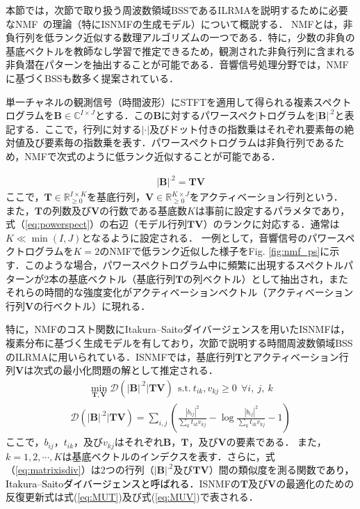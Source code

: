 {本節では，次節で取り扱う周波数領域BSSであるILRMAを説明するために必要なNMF~\cite{NMF}の理論（特にISNMFの生成モデル\cite{isnmf}）について概説する．}
NMFとは，{非負行列を低ランク近似する数理アルゴリズムの一つである．特に，少数の非負の基底ベクトルを教師なし学習で推定できるため，観測された非負行列に含まれる非負潜在パターンを抽出することが可能である．音響信号処理分野では，NMFに基づくBSSも数多く提案されている\cite{singlechsep, supNMF, MNMF_oz, iwase}．}

単一チャネルの{観測信号（時間波形）にSTFTを適用して得られる複素スペクトログラムを$\bm{B}\in\mathbb{C}^{I\times J}$とする．この$\bm{B}$に対するパワースペクトログラムを$|\bm{B}|^{.2}$と表記する．ここで，行列に対する$|\cdot|$及びドット付きの指数乗はそれぞれ要素毎の絶対値及び要素毎の指数乗を表す．パワースペクトログラムは非負行列であるため，NMFで次式のように低ランク近似することが可能である．}

\begin{align}
    |\bm{B}|^{.2} = \bm{TV}　\label{eq:powerspect}
\end{align}
ここで，$\bm{T} \in \mathbb{R}^{I \times K}_{\geq 0}$を基底行列，$\bm{V} \in \mathbb{R}^{K \times J}_{\geq 0}$をアクティベーション行列という．
{また，$\bm{T}$の列数及び$\bm{V}$の行数である基底数$K$は事前に設定するパラメタであり，式（\ref{eq:powerspect}）の右辺（モデル行列$\bm{TV}$）のランクに対応する．}通常は$K \ll \min (I,J)$となるように設定される．
{一例として，音響信号のパワースペクトログラムを$K=2$のNMFで低ランク近似した様子をFig. \ref{fig:nmf_ps}に示す．このような場合，パワースペクトログラム中に頻繁に出現するスペクトルパターンが2本の基底ベクトル（基底行列$\bm{T}$の列ベクトル）として抽出され，またそれらの時間的な強度変化がアクティベーションベクトル（アクティベーション行列$\bm{V}$の行ベクトル）に現れる．}

{特に，NMFのコスト関数にItakura--Saitoダイバージェンスを用いたISNMF\cite{isnmf}は，複素分布に基づく生成モデル\cite{GGD}を有しており，次節で説明する時間周波数領域BSSのILRMAに用いられている．ISNMFでは，}基底行列$\bm{T}$とアクティベーション行列$\bm{V}$は次式の最小化問題の解として推定される．
\begin{align}
    \min_{\bm{T,V}} \mathcal{D}(|\bm{B}|^{.2} | \bm{TV}) ~~\mathrm{s.t.} ~ t_{ik}, v_{kj} \geq 0 ~~\forall i,~j,~k
\end{align}
\begin{align}
    \mathcal{D}(|\bm{B}|^{.2}|\bm{TV}) = \sum_{i,j}\left( \frac{ |b_{ij}|^2 }{ \sum_{k}t_{ik}v_{kj} } - \log{\frac{ |b_{ij}|^2 }{ \sum_{k}t_{ik}v_{kj}}} -1 \right) \label{eq:matrixisdiv}
\end{align}
ここで，{$b_{ij}$，$t_{ik}$，及び$v_{kj}$はそれぞれ$\bm{B}$，$\bm{T}$，及び$\bm{V}$}の要素である．
また，{$k= 1, 2, \cdots, K$は基底ベクトルのインデクスを表す．さらに，式（\ref{eq:matrixisdiv}）}は2つの行列（$|\bm{B}|^{.2}$及び$\bm{TV}$）間の類似度を測る関数で\textcolor{black}{あり，Itakura--Saitoダイバージェンスと呼ばれる．}ISNMFの$\bm{T}$及び$\bm{V}$の最適化のための反復更新式は式(\ref{eq:MUT})及び式(\ref{eq:MUV})で表される\cite{MU}．

